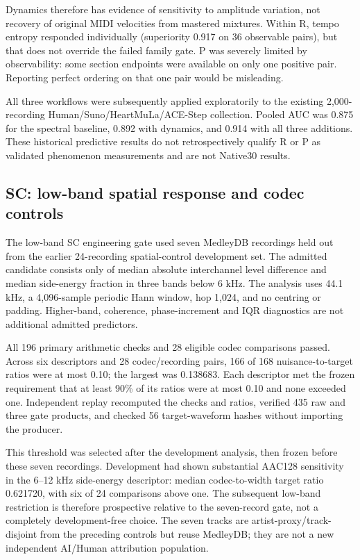 Dynamics therefore has evidence of sensitivity to amplitude variation, not
recovery of original MIDI velocities from mastered mixtures. Within R, tempo
entropy responded individually (superiority 0.917 on 36 observable pairs), but
that does not override the failed family gate. P was severely limited by
observability: some section endpoints were available on only one positive
pair. Reporting perfect ordering on that one pair would be misleading.

All three workflows were subsequently applied exploratorily to the existing
2,000-recording Human/Suno/HeartMuLa/ACE-Step collection. Pooled AUC was 0.875
for the spectral baseline, 0.892 with dynamics, and 0.914 with all three
additions. These historical predictive results do not retrospectively qualify
R or P as validated phenomenon measurements and are not Native30 results.

\subsection{SC: low-band spatial response and codec controls}

The low-band SC engineering gate used seven MedleyDB recordings held out
from the earlier 24-recording spatial-control development set. The admitted
candidate consists only of median absolute interchannel level difference
and median side-energy fraction in three bands below 6 kHz. The analysis
uses 44.1 kHz, a 4,096-sample periodic Hann window, hop 1,024, and no
centring or padding. Higher-band, coherence, phase-increment and IQR
diagnostics are not additional admitted predictors.

All 196 primary arithmetic checks and 28 eligible codec comparisons passed.
Across six descriptors and 28 codec/recording pairs, 166 of 168
nuisance-to-target ratios were at most 0.10; the largest was 0.138683.
Each descriptor met the frozen requirement that at least 90\% of its
ratios were at most 0.10 and none exceeded one. Independent replay
recomputed the checks and ratios, verified 435 raw and three gate products,
and checked 56 target-waveform hashes without importing the producer.

This threshold was selected after the development analysis, then frozen
before these seven recordings. Development had shown substantial AAC128
sensitivity in the 6--12 kHz side-energy descriptor: median codec-to-width
target ratio 0.621720, with six of 24 comparisons above one. The subsequent
low-band restriction is therefore prospective relative to the seven-record
gate, not a completely development-free choice. The seven tracks are
artist-proxy/track-disjoint from the preceding controls but reuse MedleyDB;
they are not a new independent AI/Human attribution population.

